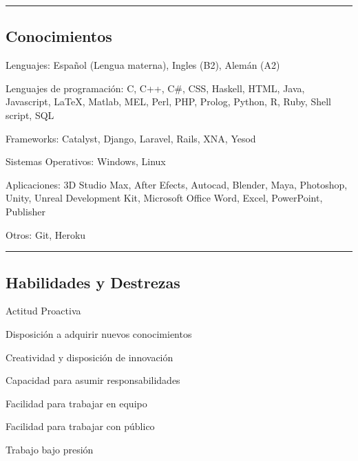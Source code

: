 \documentclass[10pt,letterpaper]{article}
\newenvironment{indentsection}[1]%
{\begin{list}{}%
	{\setlength{\leftmargin}{#1}}%
	\item[]%
}
{\end{list}}
\begin{document}

\hrule
\vspace{-0.4em}
\subsection*{Conocimientos}

\begin{indentsection}{\parindent}
\begin{description*}
	
\item[Lenguajes:]
  Español (Lengua materna), Ingles (B2), Alemán (A2)
\item[Lenguajes de programación:]
  C, C++, C\#, CSS, Haskell, HTML, Java, Javascript, \LaTeX, Matlab, MEL, Perl, PHP, Prolog, Python, R, Ruby, Shell script, SQL
\item[Frameworks:]
  Catalyst, Django, Laravel, Rails, XNA, Yesod
\item[Sistemas Operativos:]
  Windows, Linux
\item[Aplicaciones:]
  3D Studio Max, After Efects, Autocad, Blender, Maya, Photoshop, Unity, Unreal Development Kit, Microsoft Office Word, Excel, PowerPoint, Publisher
\item[Otros:]
  Git, Heroku
  
\end{description*}
\end{indentsection}


\hrule
\vspace{-0.4em}
\subsection*{Habilidades y Destrezas}

\begin{indentsection}{\parindent}
\begin{description*}

\item
  Actitud Proactiva
\item
  Disposición a adquirir nuevos conocimientos
\item
  Creatividad y disposición de innovación
\item
  Capacidad para asumir responsabilidades
\item
  Facilidad para trabajar en equipo
\item
  Facilidad para trabajar con público
\item
  Trabajo bajo presión

\end{description*}
\end{indentsection}
\end{document}
